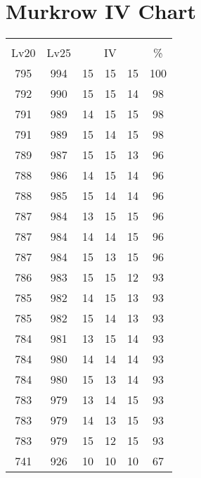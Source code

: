 \documentclass{article}%
\begin{document}
%
\normalsize%
\section{Murkrow IV Chart}%
\label{sec:Murkrow IV Chart}%
\renewcommand{\arraystretch}{1.5}%
\begin{tabular}{|c|c|c|c|c|c|}%
\hline%
\multicolumn{6}{|c|}{\textcolor{white}{ 
\linebreak{Murkrow}
}%
\cellcolor{black}}\\%
\multicolumn{1}{|c}{Lv20}&\multicolumn{1}{c|}{Lv25}&\multicolumn{3}{c|}{IV}&\multicolumn{1}{|c|}{\%}\\%
\hline%
\rowcolor{color100}%
795&994&15&15&15&100\\%
\hline%
\rowcolor{color98}%
792&990&15&15&14&98\\%
\hline%
\rowcolor{color98}%
791&989&14&15&15&98\\%
\hline%
\rowcolor{color98}%
791&989&15&14&15&98\\%
\hline%
\rowcolor{color96}%
789&987&15&15&13&96\\%
\hline%
\rowcolor{color96}%
788&986&14&15&14&96\\%
\hline%
\rowcolor{color96}%
788&985&15&14&14&96\\%
\hline%
\rowcolor{color96}%
787&984&13&15&15&96\\%
\hline%
\rowcolor{color96}%
787&984&14&14&15&96\\%
\hline%
\rowcolor{color96}%
787&984&15&13&15&96\\%
\hline%
\rowcolor{color93}%
786&983&15&15&12&93\\%
\hline%
\rowcolor{color93}%
785&982&14&15&13&93\\%
\hline%
\rowcolor{color93}%
785&982&15&14&13&93\\%
\hline%
\rowcolor{color93}%
784&981&13&15&14&93\\%
\hline%
\rowcolor{color93}%
784&980&14&14&14&93\\%
\hline%
\rowcolor{color93}%
784&980&15&13&14&93\\%
\hline%
\rowcolor{color93}%
783&979&13&14&15&93\\%
\hline%
\rowcolor{color93}%
783&979&14&13&15&93\\%
\hline%
\rowcolor{color93}%
783&979&15&12&15&93\\%
\hline%
\rowcolor{color91}%
741&926&10&10&10&67\\%
\end{tabular}

%
\end{document}
